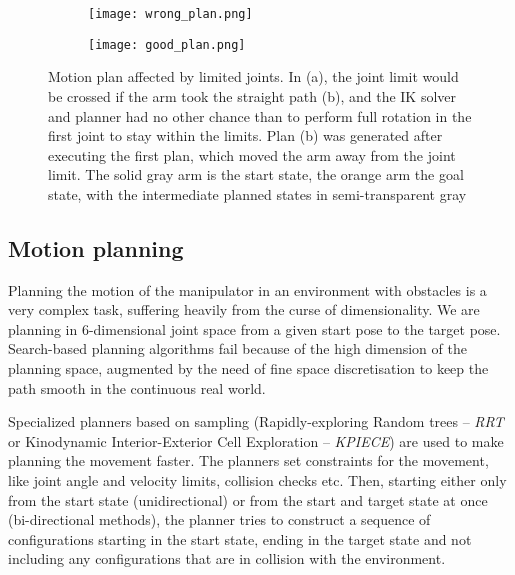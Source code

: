 \documentclass[buriama8_dp.tex]{subfiles}
\begin{document}
\begin{figure}[htp]
  \centering
  \begin{subfigure}[t]{0.49\textwidth}
    \texttt{[image: wrong\_plan.png]}
    \caption{}
    \label{fig:wrong_plan_joint}
  \end{subfigure}
  \begin{subfigure}[t]{0.49\textwidth}
    \texttt{[image: good\_plan.png]}
    \caption{}
    \label{fig:good_plan_joint}
  \end{subfigure}

  \caption[Non-optimal motion plan]{Motion plan affected by limited joints. In (a), the joint limit would be crossed if the arm took the straight path (b), and the IK solver and planner had no other chance than to perform full rotation in the first joint to stay within the limits. Plan (b) was generated after executing the first plan, which moved the arm away from the joint limit. The solid gray arm is the start state, the orange arm the goal state, with the intermediate planned states in semi-transparent gray}
  \label{fig:wrong_joints}
\end{figure}

\subsection{Motion planning}
\label{subsec:motion_planning}

Planning the motion of the manipulator in an environment with obstacles is a very complex task, suffering heavily from the curse of dimensionality. We are planning in 6-dimensional joint space from a given start pose to the target pose. Search-based planning algorithms fail because of the high dimension of the planning space, augmented by the need of fine space discretisation to keep the path smooth in the continuous real world.

Specialized planners based on sampling (Rapidly-exploring Random trees -- \emph{RRT} \cite{rrt}  or Kinodynamic Interior-Exterior Cell Exploration -- \emph{KPIECE}) are used to make planning the movement faster. The planners set constraints for the movement, like joint angle and velocity limits, collision checks etc. Then, starting either only from the start state (unidirectional) or from the start and target state at once (bi-directional methods), the planner tries to construct a sequence of configurations starting in the start state, ending in the target state and not including any configurations that are in collision with the environment.
\end{document}
